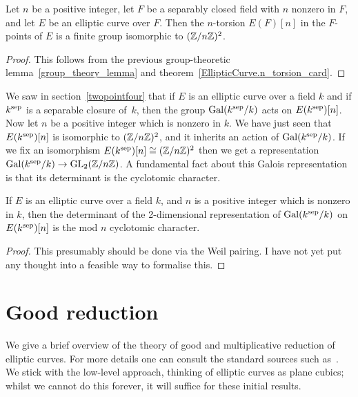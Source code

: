 \begin{corollary}\label{Elliptic_curve_n_torsion_2d}
  Let $n$ be a positive integer, let $F$ be a separably closed
  field with $n$ nonzero in $F$, and let $E$ be an elliptic curve over $F$. Then the $n$-torsion $E(F)[n]$ 
  in the $F$-points of $E$ is a finite group isomorphic to $(\mathbb{Z}/n\mathbb{Z})^2$.
\end{corollary}
\begin{proof}
  This follows from the previous group-theoretic lemma~\ref{group_theory_lemma} and
  theorem~\ref{EllipticCurve.n_torsion_card}.
\end{proof}

We saw in section~\ref{twopointfour} that if $E$ is an elliptic curve over a field $k$ and if $k^{\operatorname{sep}}$ is a separable closure of~$k$, then the group $\operatorname{Gal}(k^{\operatorname{sep}}/k)$ acts on $E(k^{\operatorname{sep}})[n]$. Now let $n$ be a positive integer which is nonzero in $k$. We have just seen that $E(k^{\operatorname{sep}})[n]$ is isomorphic to $(\mathbb{Z}/n\mathbb{Z})^2$, and it inherits an action of $\operatorname{Gal}(k^{\operatorname{sep}}/k)$. If we fix an isomorphism $E(k^{\operatorname{sep}})[n]\cong(\mathbb{Z}/n\mathbb{Z})^2$ then we get a representation $\operatorname{Gal}(k^{\operatorname{sep}}/k)\to\operatorname{GL}_2(\mathbb{Z}/n\mathbb{Z})$. A fundamental fact about this Galois representation is that its determinant is the cyclotomic character.

\begin{theorem}\label{Elliptic_curve_det_n_torsion} If $E$ is an elliptic curve over a field $k$, and $n$ is a positive integer which is nonzero in $k$, then the determinant of the 2-dimensional representation of $\operatorname{Gal}(k^{\operatorname{sep}}/k)$ on $E(k^{\operatorname{sep}})[n]$ is the mod $n$ cyclotomic character.
\end{theorem}
\begin{proof}
  This presumably should be done via the Weil pairing. I have not yet put any thought into a feasible way to formalise this.
\end{proof}

\section{Good reduction}

We give a brief overview of the theory of good and multiplicative reduction of elliptic curves.
For more details one can consult the standard sources such as~\cite{silverman1}. We stick with the low-level approach, thinking of elliptic curves as plane cubics; whilst we cannot do this forever, it will suffice for these initial results.

